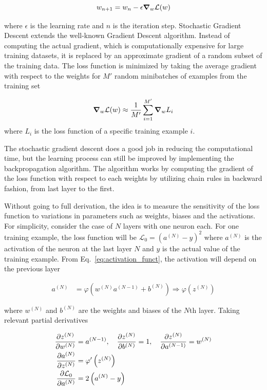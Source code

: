 \begin{equation}
    w_{n+1} = w_n - \epsilon  \grad_w \mathcal{L}(w)
\end{equation}

where $\epsilon$ is the learning rate and $n$ is the iteration step. Stochastic
Gradient Descent extends the well-known Gradient Descent algorithm. Instead of
computing the
actual gradient, which is computationally expensive for large training
datasets,  it is replaced
by an approximate gradient of a random subset of the training data. The loss
function is minimized by taking  the average gradient with respect to the
weights for $M'$ random minibatches of examples from the training set

\begin{align}
    \grad_w \mathcal{L}(w) \approx \frac{1}{M'} \sum_{i=1}^{M'} \grad_w L_i
\end{align}
where $L_i$ is the loss function of a specific training example $i$.

The stochastic gradient descent does a good job in reducing the computational
time, but the learning process can still be improved by implementing the
backpropagation algorithm. The algorithm works by computing the gradient of
the loss function with respect to each weights by utilizing chain rules in
backward fashion, from last layer to the first.

Without going to full derivation, the idea is to measure the sensitivity of the
loss function  to variations in  parameters such as weights,
biases and the activations.  For simplicity, consider the case of $N$ layers
with one neuron each. For one training example,  the loss function will be
$\mathcal{L}_0 = \left(a^{(N)} - y \right)^2$ where $a^{(N)}$ is the activation
of the
neuron at the last layer $N$ and $y$ is the actual value of the training
example. From Eq.~\eqref{eq:activation_funct}, the activation will depend on
the previous layer

\begin{align}
    a^{(N)} & = \varphi \left( w^{(N)} a^{(N-1)} + b^{(N)} \right)
    \Longrightarrow
    \varphi
    \left( z^{(N)} \right)
\end{align}

where $w^{(N)}$ and $b^{(N)}$ are the weights and biases of the $N$th layer.
Taking relevant partial derivatives

\begin{align}
    \pdv{z^{(N)}}{w^{(N)}}       & = a^{(N-1)}, \quad \pdv{z^{(N)}}{b^{(N)}}
    =1,
    \quad \pdv{z^{(N)}}{a^{(N-1)}} = w^{(N)}                                 \\
    \pdv{a^{(N)}}{z^{(N)}}       & = \varphi'
    \left( z^{(N)} \right)                                                   \\
    \pdv{\mathcal{L}_0}{a^{(N)}} & = 2 \left(a^{(N)} - y \right)
\end{align}

